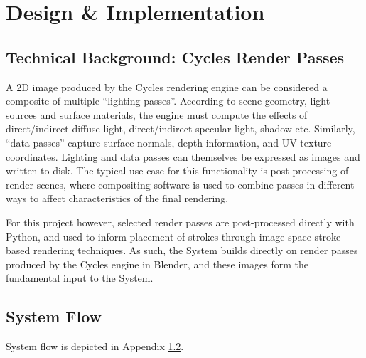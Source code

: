 


\chapter{Design \& Implementation}\label{design_implementation}

\section{Technical Background: Cycles Render Passes}

A 2D image produced by the Cycles rendering engine can be considered a composite of multiple ``lighting passes''.
According to scene geometry, light sources and surface materials, the engine must compute the effects of direct/indirect diffuse light, direct/indirect specular light, shadow etc.
Similarly, ``data passes'' capture surface normals, depth information, and UV texture-coordinates.
Lighting and data passes can themselves be expressed as images and written to disk.
The typical use-case for this functionality is post-processing of render scenes, where compositing software is used to combine passes in different ways to affect characteristics of the final rendering.

For this project however, selected render passes are post-processed directly with Python, and used to inform placement of strokes through image-space stroke-based rendering techniques. As such, the System builds directly on render passes produced by the Cycles engine in Blender, and these images form the fundamental input to the System.

\section{System Flow}


System flow is depicted in Appendix \ref{}.

